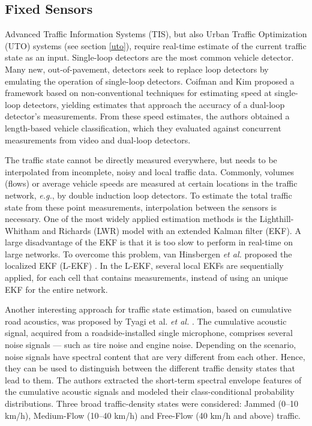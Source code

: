 \documentclass[10pt,onecolumn]{article}
\begin{document}
\subsection{Fixed Sensors}

Advanced Traffic Information Systems (TIS), but also Urban Traffic Optimization (UTO) systems (see section \ref{uto}), require real-time estimate of the current traffic state as an input. Single-loop detectors are the most common vehicle detector. Many new, out-of-pavement, detectors seek to replace loop detectors by emulating the operation of single-loop detectors. 
Coifman and Kim \cite{Coifman2009} proposed a framework based on non-conventional techniques for estimating speed at single-loop detectors, yielding estimates that approach the accuracy of a dual-loop detector's measurements. 
From these speed estimates, the authors obtained a length-based vehicle classification, which they evaluated against concurrent measurements from video and dual-loop detectors.


The traffic state cannot be directly measured everywhere, but needs to be interpolated from incomplete, noisy and local traffic data. Commonly, volumes (flows) or average vehicle speeds are measured at certain locations in the traffic network, \textit{e.g.}, by double induction loop detectors. To estimate the total traffic state from these point measurements, interpolation between the sensors is necessary. 
One of the most widely applied estimation methods is the Lighthill-Whitham and Richards (LWR) model \cite{Lightill1955} \cite{Richards1956} with an extended Kalman filter (EKF). 
A large disadvantage of the EKF is that it is too slow to perform in real-time on large networks. To overcome this problem, van Hinsbergen \textit{et al.} proposed the localized EKF (L-EKF) \cite{vanHinsbergen2012}. In the L-EKF, several local EKFs are sequentially applied, for each cell that contains measurements, instead of using an unique EKF for the entire network. 

Another interesting approach for traffic state estimation, based on cumulative road acoustics, was proposed by Tyagi et al. \textit{et al.} \cite{Tyagi2012}. The cumulative acoustic signal, acquired from a roadside-installed single microphone, comprises several noise signals — such as tire noise and engine noise. Depending on the scenario, noise signals have spectral content that are very different from each other. Hence, they can be used to distinguish between the different traffic density states that lead to them. The authors extracted the short-term spectral envelope features of the cumulative acoustic signals and modeled their class-conditional probability distributions. Three broad traffic-density states were considered: Jammed (0–10 km/h), Medium-Flow (10–40 km/h) and Free-Flow (40
km/h and above) traffic. 
\end{document}
